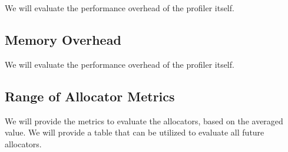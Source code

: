 We will evaluate the performance overhead of the profiler itself. 

\subsection{Memory Overhead}
\label{sec:memory}

We will evaluate the performance overhead of the profiler itself. 

\subsection{Range of Allocator Metrics}
We will provide the metrics to evaluate the allocators, based on the averaged value. 
We will provide a table that can be utilized to evaluate all future allocators. 

